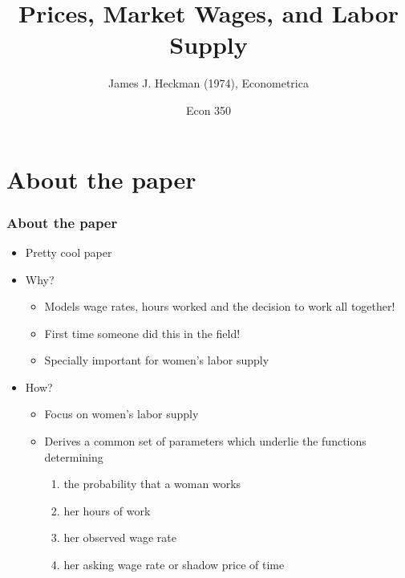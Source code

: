 

\title{Prices, Market Wages, and Labor Supply}
\subtitle{James J. Heckman (1974), Econometrica}
\author{Econ 350}




\begin{frame}[plain]
	\titlepage
\end{frame}



\section{About the paper}

\begin{frame}
	\frametitle{About the paper}
		\begin{itemize}
 			\item Pretty cool paper
 			\item Why?
 				\begin{itemize}
 					\item Models wage rates, hours worked and the decision to work all together! 
 					\item First time someone did this in the field!
 					\item Specially important for women's labor supply
 				\end{itemize}
 			\item How?
 				\begin{itemize}
 					\item Focus on women's labor supply
 					\item Derives a common set of parameters which underlie the functions determining 
 					\begin{enumerate}
 						\item the probability that a woman works
 						\item her hours of work
 						\item her observed wage rate
 						\item her asking wage rate or shadow price of time
 					\end{enumerate}
 				\end{itemize}
 		\end{itemize}
\end{frame}

